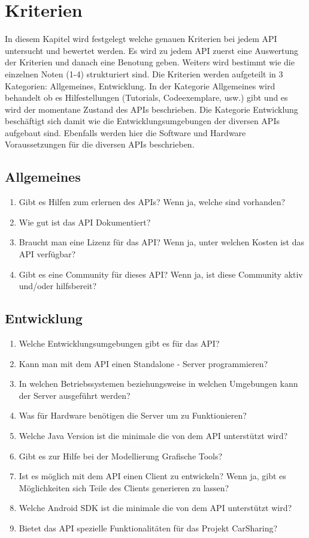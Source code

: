 \chapter{Kriterien} \label{Kriterien}
	
	In diesem Kapitel wird festgelegt welche genauen Kriterien bei jedem API untersucht und bewertet werden. Es wird zu jedem API zuerst eine Auswertung der Kriterien und danach eine Benotung geben. Weiters wird bestimmt wie die einzelnen Noten (1-4) strukturiert sind. Die Kriterien werden aufgeteilt in 3 Kategorien: Allgemeines, Entwicklung. In der Kategorie Allgemeines wird behandelt ob es Hilfestellungen (Tutorials, Codeexemplare, usw.) gibt und es wird der momentane Zustand des APIs beschrieben. Die Kategorie Entwicklung beschäftigt sich damit wie die Entwicklungsumgebungen der diversen APIs aufgebaut sind. Ebenfalls werden hier die Software und Hardware Voraussetzungen für die diversen APIs beschrieben. 
	
	\section{Allgemeines}
		\begin{enumerate}
			\item Gibt es Hilfen zum erlernen des APIs?
			\subitem Wenn ja, welche sind vorhanden?
			\item Wie gut ist das API Dokumentiert?
			\item Braucht man eine Lizenz für das API?
			\subitem Wenn ja, unter welchen Kosten ist das API verfügbar?
			\item Gibt es eine Community für dieses API?
			\subitem Wenn ja, ist diese Community aktiv und/oder hilfsbereit? 
		\end{enumerate}
	
	\section{Entwicklung}
		\begin{enumerate}
			\item Welche Entwicklungsumgebungen gibt es für das API?
			\item Kann man mit dem API einen Standalone - Server programmieren?
			\item In welchen Betriebssystemen beziehungsweise in welchen Umgebungen kann der Server ausgeführt werden?
			\item Was für Hardware benötigen die Server um zu Funktionieren?
			\item Welche Java Version ist die minimale die von dem API unterstützt wird?
			\item Gibt es zur Hilfe bei der Modellierung Grafische Tools?
			\item Ist es möglich mit dem API einen Client zu entwickeln?
			\subitem Wenn ja, gibt es Möglichkeiten sich Teile des Clients generieren zu lassen?
			\item Welche Android SDK ist die minimale die von dem API unterstützt wird?
			\item Bietet das API spezielle Funktionalitäten für das Projekt CarSharing?
		\end{enumerate}
	
